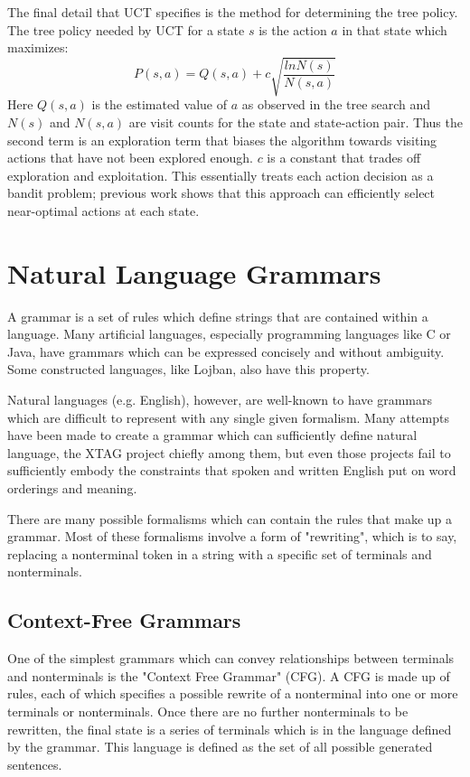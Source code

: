 The final detail that UCT specifies is the method for determining the tree policy.
The tree policy needed by UCT for a state $s$ is the action $a$ in that state which maximizes:
\begin{equation}
P(s,a) = Q(s,a) + c\sqrt{\frac{ln N(s)}{N(s,a)}}\label{eqn:uct}
\end{equation}
Here $Q(s,a)$ is the estimated value of $a$ as observed in the tree
search and $N(s)$ and $N(s,a)$ are visit counts for the state and
state-action pair. Thus the second term is an exploration term that
biases the algorithm towards visiting actions that have not been
explored enough. $c$ is a constant that trades off exploration and
exploitation. This essentially treats each action decision
as a bandit problem; previous work shows that this approach can
efficiently select near-optimal actions at each state.


\section{Natural Language Grammars}

A grammar is a set of rules which define strings that are contained within a language.
Many artificial languages, especially programming languages like C or Java, have
grammars which can be expressed concisely and without ambiguity.  Some
constructed languages, like Lojban, also have this property.

Natural languages (e.g. English), however, are well-known to have grammars which are difficult
to represent with any single given formalism.  Many attempts have been made to
create a grammar which can sufficiently define natural language, the XTAG project chiefly
among them, but even those projects fail to sufficiently embody the
constraints that spoken and written English put on word orderings and meaning.

There are many possible formalisms which can contain the rules that make up
a grammar.  Most of these formalisms involve a form of "rewriting", which
is to say, replacing a nonterminal token in a string with a specific set of
terminals and nonterminals.

\subsection{Context-Free Grammars}

One of the simplest grammars which can convey relationships between terminals
and nonterminals is the "Context Free Grammar" (CFG).  A CFG is made up of rules,
each of which specifies a possible rewrite of a nonterminal into one or more
terminals or nonterminals.  Once there are no further nonterminals to be rewritten,
the final state is a series of terminals which is in the language defined by the grammar.
This language is defined as the set of all possible generated sentences.

